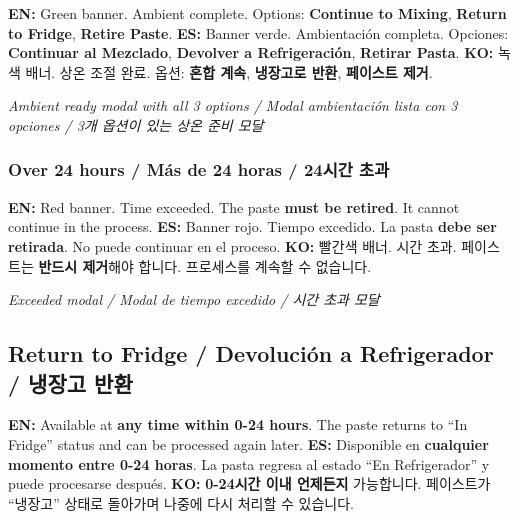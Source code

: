 \documentclass[12pt,a4paper]{article}
\newcommand{\tri}[3]{%
  \textbf{EN:} #1 \quad\textbar\quad \textbf{ES:} #2 \quad\textbar\quad \textbf{KO:} #3%
}
\begin{document}
\tri{Green banner. Ambient complete. Options: \textbf{Continue to Mixing}, \textbf{Return to Fridge}, \textbf{Retire Paste}.}
{Banner verde. Ambientación completa. Opciones: \textbf{Continuar al Mezclado}, \textbf{Devolver a Refrigeración}, \textbf{Retirar Pasta}.}
{녹색 배너. 상온 조절 완료. 옵션: \textbf{혼합 계속}, \textbf{냉장고로 반환}, \textbf{페이스트 제거}.}

\begin{photobox}
\centering
\vspace{3.5cm}
\textit{Ambient ready modal with all 3 options / Modal ambientación lista con 3 opciones / 3개 옵션이 있는 상온 준비 모달}
\vspace{0.5cm}
\end{photobox}

\subsubsection*{Over 24 hours / Más de 24 horas / 24시간 초과}

\begin{dangerbox}
\tri{Red banner. Time exceeded. The paste \textbf{must be retired}. It cannot continue in the process.}
{Banner rojo. Tiempo excedido. La pasta \textbf{debe ser retirada}. No puede continuar en el proceso.}
{빨간색 배너. 시간 초과. 페이스트는 \textbf{반드시 제거}해야 합니다. 프로세스를 계속할 수 없습니다.}
\end{dangerbox}

\begin{photobox}
\centering
\vspace{3cm}
\textit{Exceeded modal / Modal de tiempo excedido / 시간 초과 모달}
\vspace{0.5cm}
\end{photobox}

\subsection{Return to Fridge / Devolución a Refrigerador / 냉장고 반환}

\tri{Available at \textbf{any time within 0-24 hours}. The paste returns to ``In Fridge'' status and can be processed again later.}
{Disponible en \textbf{cualquier momento entre 0-24 horas}. La pasta regresa al estado ``En Refrigerador'' y puede procesarse después.}
{\textbf{0-24시간 이내 언제든지} 가능합니다. 페이스트가 ``냉장고'' 상태로 돌아가며 나중에 다시 처리할 수 있습니다.}
\end{document}
